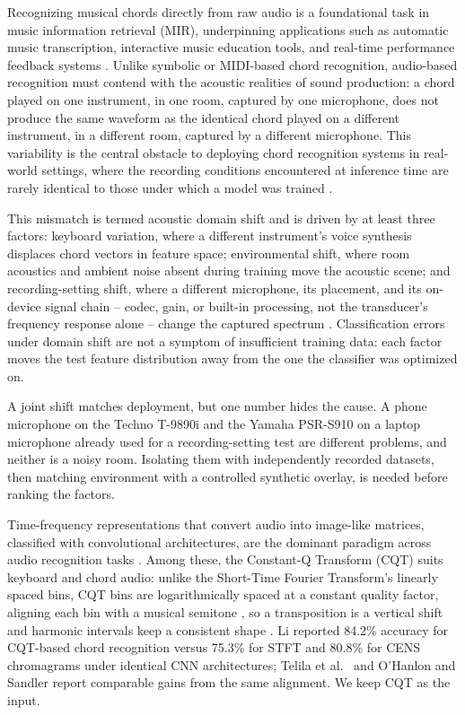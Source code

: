 \documentclass[pdflatex,sn-mathphys-num,iicol]{sn-jnl}
\theoremstyle{thmstyleone}
\theoremstyle{thmstyletwo}
\theoremstyle{thmstylethree}
\begin{document}
Recognizing musical chords directly from raw audio is a foundational task in music information retrieval (MIR), underpinning applications such as automatic music transcription, interactive music education tools, and real-time performance feedback systems \cite{Telila2023}\cite{Saputra2021}\cite{Moysis2023}. Unlike symbolic or MIDI-based chord recognition, audio-based recognition must contend with the acoustic realities of sound production: a chord played on one instrument, in one room, captured by one microphone, does not produce the same waveform as the identical chord played on a different instrument, in a different room, captured by a different microphone. This variability is the central obstacle to deploying chord recognition systems in real-world settings, where the recording conditions encountered at inference time are rarely identical to those under which a model was trained \cite{Kusaka2024}.

This mismatch is termed acoustic domain shift and is driven by at least three factors: keyboard variation, where a different instrument's voice synthesis displaces chord vectors in feature space; environmental shift, where room acoustics and ambient noise absent during training move the acoustic scene; and recording-setting shift, where a different microphone, its placement, and its on-device signal chain -- codec, gain, or built-in processing, not the transducer's frequency response alone -- change the captured spectrum \cite{Kusaka2024}\cite{Majchrzak2025}. Classification errors under domain shift are not a symptom of insufficient training data: each factor moves the test feature distribution away from the one the classifier was optimized on.

A joint shift matches deployment, but one number hides the cause. A phone microphone on the Techno T-9890i and the Yamaha PSR-S910 on a laptop microphone already used for a recording-setting test are different problems, and neither is a noisy room. Isolating them with independently recorded datasets, then matching environment with a controlled synthetic overlay, is needed before ranking the factors.

Time-frequency representations that convert audio into image-like matrices, classified with convolutional architectures, are the dominant paradigm across audio recognition tasks \cite{Wolf-Monheim2025}\cite{Zaman2023}\cite{Moysis2023}. Among these, the Constant-Q Transform (CQT) suits keyboard and chord audio: unlike the Short-Time Fourier Transform's linearly spaced bins, CQT bins are logarithmically spaced at a constant quality factor, aligning each bin with a musical semitone \cite{Lacoste2007}, so a transposition is a vertical shift and harmonic intervals keep a consistent shape \cite{Li2021}. Li \cite{Li2021} reported 84.2\% accuracy for CQT-based chord recognition versus 75.3\% for STFT and 80.8\% for CENS chromagrams under identical CNN architectures; Telila et al.\ \cite{Telila2023} and O'Hanlon and Sandler \cite{OHanlon2021} report comparable gains from the same alignment. We keep CQT as the input.
\end{document}
